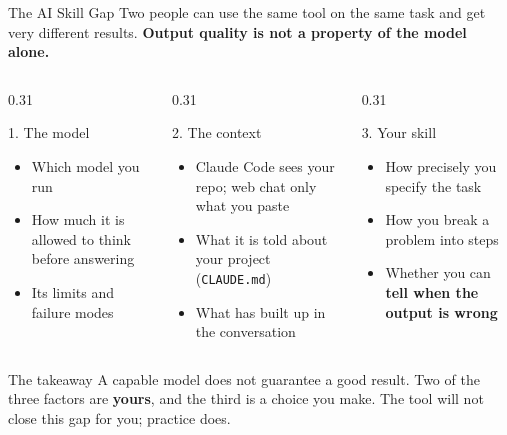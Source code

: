 \documentclass[aspectratio=169, 11pt]{beamer}
\begin{document}
\begin{frame}{The AI Skill Gap}
  \small
  Two people can use the same tool on the same task and get very different results. \textbf{Output quality is not a property of the model alone.}

  \vspace{0.3em}
  \begin{columns}[T]
    \begin{column}{0.31\textwidth}
      \begin{block}{1. The model}
        \begin{itemize}
          \item Which model you run
          \item How much it is allowed to think before answering
          \item Its limits and failure modes
        \end{itemize}
      \end{block}
    \end{column}
    \begin{column}{0.31\textwidth}
      \begin{block}{2. The context}
        \begin{itemize}
          \item Claude Code sees your repo; web chat only what you paste
          \item What it is told about your project (\texttt{CLAUDE.md})
          \item What has built up in the conversation
        \end{itemize}
      \end{block}
    \end{column}
    \begin{column}{0.31\textwidth}
      \begin{block}{3. Your skill}
        \begin{itemize}
          \item How precisely you specify the task
          \item How you break a problem into steps
          \item Whether you can \textbf{tell when the output is wrong}
        \end{itemize}
      \end{block}
    \end{column}
  \end{columns}

  \vspace{0.3em}
  \begin{alertblock}{The takeaway}
    A capable model does not guarantee a good result. Two of the three factors are \textbf{yours}, and the third is a choice you make. The tool will not close this gap for you; practice does.
  \end{alertblock}
\end{frame}
\end{document}
